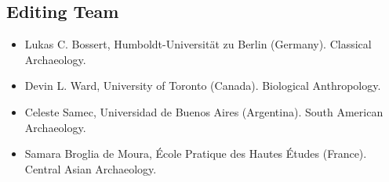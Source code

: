\begin{footnotesize}
\section*{Editing Team}
\begin{itemize}
		\setlength{\itemsep}{0pt}%
		\setlength{\parskip}{0pt}%
		\setlength{\parsep}{0pt}%
\item Lukas C. Bossert, Humboldt-Universität zu Berlin (Germany). Classical Archaeology.
\item Devin L. Ward, University of Toronto (Canada). Biological Anthropology.
\item Celeste Samec, Universidad de Buenos Aires (Argentina). South American Archaeology.
\item Samara Broglia de Moura, École Pratique des Hautes Études (France). Central Asian Archaeology.

\end{itemize}

\end{footnotesize}
